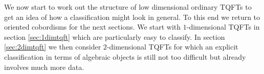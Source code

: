 We now start to work out the structure of low dimensional ordinary TQFTs to get an idea of how a classification might look in general. To this end we return to oriented cobordisms for the next sections. We start with $1$-dimensional TQFTs in section \ref{sec:1dimtqft} which are particularly easy to classify. In section \ref{sec:2dimtqft} we then consider $2$-dimensional TQFTs for which an explicit classification in terms of algebraic objects is still not too difficult but already involves much more data.

